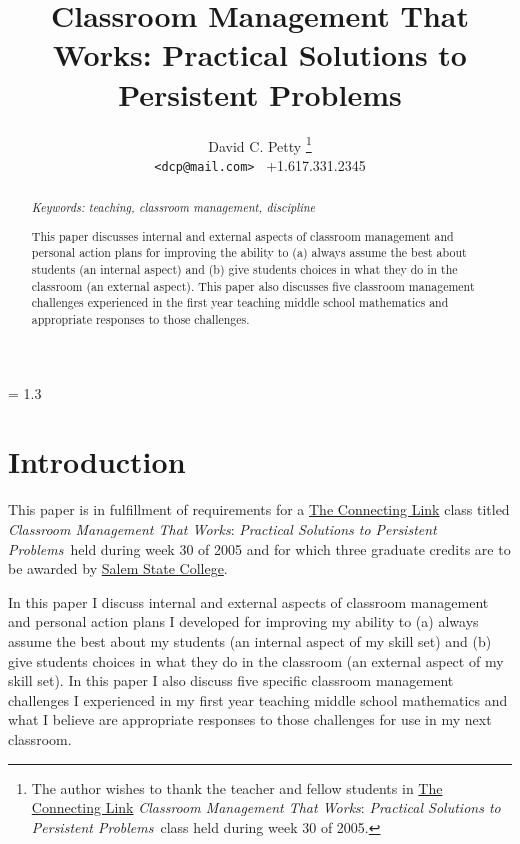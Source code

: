 \documentclass[11pt,twocolumn]{article}%
\def\cmtw{{\em Classroom Management That Works}}
\def\cmtwfull{\cmtw: {\em Practical Solutions to
Persistent Problems\texttrademark}}
\begin{document}
\title{\large {\bf Classroom Management That Works: Practical
Solutions to Persistent Problems\texttrademark}}%

\author{David C. Petty %
\thanks{The author wishes to thank the teacher and fellow students in
\href{http://connectinglink.com}{The Connecting Link} \cmtwfull\
class held during week 30 of 2005.} \\ %
{\small \texttt{\textless dcp@mail.com\textgreater} \textbullet \ +1.617.331.2345}}%

\date{ } %

\maketitle

\begin{abstract}


{\em Keywords: teaching, classroom management, discipline %

This paper discusses internal and external aspects of classroom
management and personal action plans for improving the ability to
(a) always assume the best about students (an internal aspect) and
(b) give students choices in what they do in the classroom (an
external aspect). This paper also discusses five classroom
management challenges experienced in the first year teaching middle
school mathematics and appropriate responses to those challenges.

}

\end{abstract}

\baselineskip = 1.3\baselineskip

\section{Introduction}
\label{Introduction}


This paper is in fulfillment of requirements for a
\href{http://connectinglink.com}{The Connecting Link} class titled
\cmtwfull\ held during week 30 of 2005 and for which three graduate
credits are to be awarded by \href{http://salemstate.edu/}{Salem
State College}.

In this paper I discuss internal and external aspects of classroom
management and personal action plans I developed for improving my
ability to (a) always assume the best about my students (an internal
aspect of my skill set) and (b) give students choices in what they
do in the classroom (an external aspect of my skill set). In this
paper I also discuss five specific classroom management challenges I
experienced in my first year teaching middle school mathematics and
what I believe are appropriate responses to those challenges for use
in my next classroom.
\end{document}
